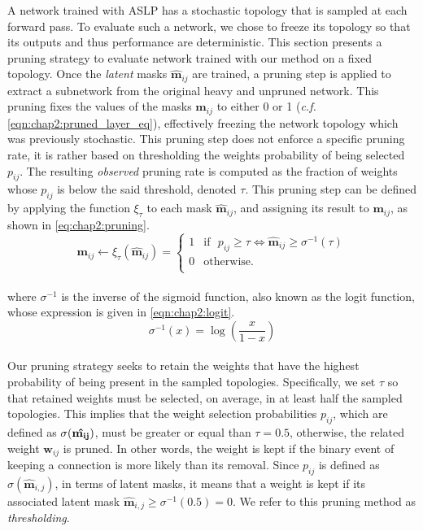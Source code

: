 A network trained with \ac{ASLP} has a stochastic topology that is sampled at
each forward pass. To evaluate such a network, we chose to freeze its topology
so that its outputs and thus performance are deterministic. This section
presents a pruning strategy to evaluate network trained with our method on a
fixed topology. Once the \emph{latent} masks $\bm{\hat{m}}_{ij}$ are trained, a
pruning step is applied to extract a subnetwork from the original heavy and
unpruned network. This pruning fixes the values of the masks $\bm{m}_{ij}$ to
either 0 or 1 (\emph{c.f.} \cref{eqn:chap2:pruned_layer_eq}), effectively
freezing the network topology which was previously stochastic. This pruning step
does not enforce a specific pruning rate, it is rather based on thresholding the
weights probability of being selected $p_{ij}$. The resulting \emph{observed}
pruning rate is computed as the fraction of weights whose $p_{ij}$ is below the
said threshold, denoted $\tau$. This pruning step can be defined by applying the
function $\xi_\tau$ to each mask $\bm{\hat{m}}_{ij}$, and assigning its result
to $\bm{m}_{ij}$, as shown in \cref{eq:chap2:pruning}.\\

\begin{equation}
  \bm{m}_{ij} \leftarrow \xi_\tau(\bm{\hat{m}}_{ij}) =
  \left\{
  \begin{array}{ll}
    1 & \text{if~~}  p_{ij} \geq \tau \Leftrightarrow  \bm{\hat{m}}_{ij} \geq \sigma^{-1}(\tau) \\
    0 & \text{otherwise.}                                                                       \\
  \end{array}
  \right.
  \label{eq:chap2:pruning}
\end{equation}\\

\noindent where $\sigma^{-1}$ is the inverse of the sigmoid function, also known
as the logit function, whose expression is given in \cref{eqn:chap2:logit}.\\

\begin{equation}
  \sigma^{-1}(x) = \log\left(\frac{x}{1-x}\right)
  \label{eqn:chap2:logit}
\end{equation}\\

Our pruning strategy seeks to retain the weights that have the highest
probability of being present in the sampled topologies. Specifically, we set
$\tau$ so that retained weights must be selected, on average, in at least half
the sampled topologies. This implies that the weight selection probabilities
$p_{ij}$, which are defined as $\sigma(\bf{\hat{m_{ij}}})$, must be greater or
equal than $\tau=0.5$, otherwise, the related weight $\bm{w}_{ij}$ is pruned. In
other words, the weight is kept if the binary event of keeping a connection is
more likely than its removal. Since $p_{ij}$ is defined as
$\sigma(\bm{\hat{m}}_{i,j})$, in terms of latent masks, it means that a weight
is kept if its associated latent mask $\bm{\hat{m}}_{i,j} \geq
\sigma^{-1}(0.5)=0$. We refer to this pruning method as \textit{thresholding}.\\


